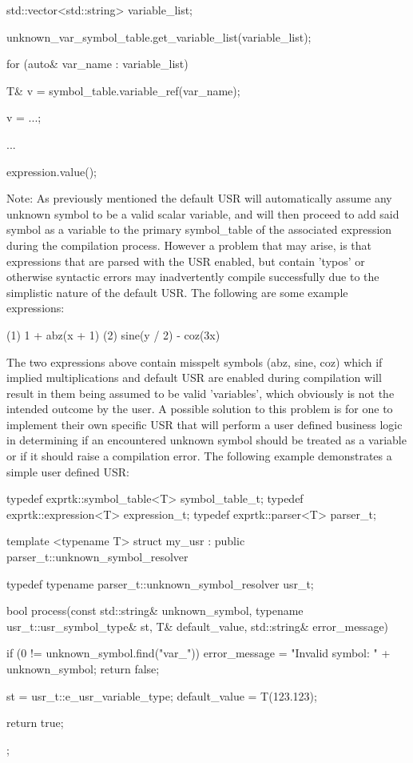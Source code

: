 std::vector<std::string> variable\_list;

unknown\_var\_symbol\_table.get\_variable\_list(variable\_list);

for (auto\& var\_name : variable\_list)
{
T\& v = symbol\_table.variable\_ref(var\_name);

v = ...;
}

...

expression.value();


Note:  As  previously  mentioned the  default  USR  will automatically
assume any unknown symbol to be a valid scalar variable, and will then
proceed to add said symbol  as a variable to the  primary symbol\_table
of the associated expression during the compilation process. However a
problem that may arise, is  that expressions that are parsed  with the
USR enabled,  but contain  'typos' or  otherwise syntactic  errors may
inadvertently compile successfully due to the simplistic nature of the
default USR. The following are some example expressions:

(1) 1 + abz(x + 1)
(2) sine(y / 2) - coz(3x)


The two  expressions above contain misspelt  symbols (abz,  sine, coz)
which if implied  multiplications and default  USR are enabled  during
compilation will result in them being assumed to be valid 'variables',
which obviously is  not the intended  outcome by the  user. A possible
solution to this  problem is for  one to implement  their own specific
USR that will perform a user defined business logic in determining  if
an encountered unknown symbol should be treated as a variable or if it
should raise a compilation error. The following example demonstrates a
simple user defined USR:

typedef exprtk::symbol\_table<T> symbol\_table\_t;
typedef exprtk::expression<T>     expression\_t;
typedef exprtk::parser<T>             parser\_t;

template <typename T>
struct my\_usr : public parser\_t::unknown\_symbol\_resolver
{
typedef typename parser\_t::unknown\_symbol\_resolver usr\_t;

bool process(const std::string\& unknown\_symbol,
typename usr\_t::usr\_symbol\_type\& st,
T\& default\_value,
std::string\& error\_message)
{
	if (0 != unknown\_symbol.find("var\_"))
	{
		error\_message = "Invalid symbol: " + unknown\_symbol;
		return false;
	}
	
	st = usr\_t::e\_usr\_variable\_type;
	default\_value = T(123.123);
	
	return true;
}
};

